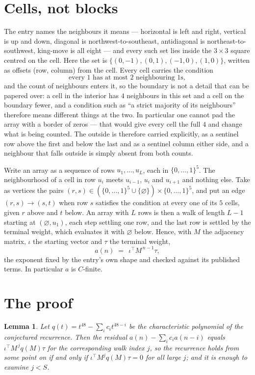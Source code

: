 \documentclass[11pt,a4paper]{article}
\theoremstyle{plain}
\newtheorem{lemma}[theorem]{Lemma}
\theoremstyle{definition}
\begin{document}
\section{Cells, not blocks}

The entry names the neighbours it means --- horizontal is left and right, vertical is up and
down, diagonal is northwest-to-southeast, antidiagonal is northeast-to-southwest, king-move is
all eight --- and every such set lies inside the $3\times3$ square centred on the cell. Here
the set is $\{(0,-1), (0,1), (-1,0), (1,0)\}$, written as offsets (row, column) from the cell. Every cell carries
the condition
\[
\text{every 1 has at most 2 neighbouring 1s},
\]
and the count of neighbours enters it, so the boundary is not a detail that can be papered
over: a cell in the interior has $4$ neighbours in this set and a cell on the boundary
fewer, and a condition such as ``a strict majority of its neighbours'' therefore means
different things at the two. In particular one cannot pad the array with a border of zeros ---
that would give every cell the full $4$ and change what is being counted. The outside is
therefore carried
explicitly, as a sentinel row above the first and below the last and as a sentinel column
either side, and a neighbour that falls outside is simply absent from both counts.

Write an array as a sequence of rows $u_1,\dots,u_L$, each in
$\{0,\dots,1\}^{5}$. The neighbourhood of a cell in row $u_i$ meets $u_{i-1}$,
$u_i$ and $u_{i+1}$ and nothing else. Take as vertices the pairs
$(r,s)\in(\{0,\dots,1\}^{5}\cup\{\varnothing\})\times\{0,\dots,1\}^{5}$,
and put an edge $(r,s)\to(s,t)$ when row $s$ satisfies the condition at every one of its
$5$ cells, given $r$ above and $t$ below. An array with $L$ rows is then a walk of length
$L-1$ starting at $(\varnothing,u_1)$, each step settling one row, and the last row is
settled by the terminal weight, which evaluates it with $\varnothing$ below. Hence,
with $M$ the adjacency matrix, $\iota$ the starting vector and $\tau$ the terminal weight,
\[
a(n)\;=\;\,\iota^{\!\top}M^{\,n-1}\tau ,
\]
the exponent fixed by the entry's own shape and checked against its published terms. In
particular $a$ is $C$-finite.

\section{The proof}

\begin{lemma}\label{lem:crit}
Let $q(t)=t^{48}-\sum_i c_it^{48-i}$ be the characteristic polynomial of the
conjectured recurrence. Then the residual $a(n)-\sum_ic_ia(n-i)$ equals
$\iota^{\!\top}M^{\,j}q(M)\tau$ for the corresponding walk index $j$, so the
recurrence holds from some point on if and only if $\iota^{\!\top}M^{j}q(M)\tau=0$ for all
large $j$; and it is enough to examine $j<S$.
\end{lemma}
\end{document}
